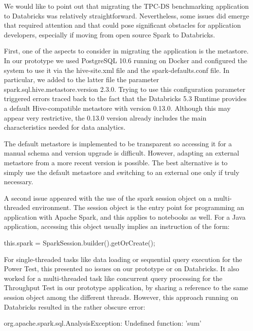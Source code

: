 We would like to point out that migrating the TPC-DS benchmarking application to Databricks was relatively straightforward. Nevertheless, some issues did emerge that required attention and that could pose significant obstacles for application developers, especially if moving from open source Spark to Databricks.

First, one of the aspects to consider in migrating the application is the metastore. In our prototype we used PostgreSQL 10.6 running on Docker and configured the system to use it via the hive-site.xml file and the spark-defaults.conf file. In particular, we added to the latter file the parameter spark.sql.hive.metastore.version 2.3.0. Trying to use this configuration parameter triggered errors traced back to the fact that the Databricks 5.3 Runtime provides a default Hive-compatible metastore with version 0.13.0. Although this may appear very restrictive, the 0.13.0 version already includes the main characteristics needed for data analytics.

The default metastore is implemented to be transparent so accessing it for a manual schema and version upgrade is difficult. However, adapting an external metastore from a more recent version is possible. The best alternative is to simply use the default metastore and switching to an external one only if truly necessary.

A second issue appeared with the use of the spark session object on a multi-threaded environment. The session object is the entry point for programming an application with Apache Spark, and this applies to notebooks as well. For a Java application, accessing this object usually implies an instruction of the form:

\vspace{0.5cm}
\noindent this.spark = SparkSession.builder().getOrCreate();
\vspace{0.5cm}

For single-threaded tasks like data loading or sequential query execution for the Power Test, this presented no issues on our prototype or on Databricks. It also worked for a multi-threaded task like concurrent query processing for the Throughput Test in our prototype application, by sharing a reference to the same session object among the different threads. However, this approach running on Databricks resulted in the rather
obscure error:

\vspace{0.5cm}
\noindent org.apache.spark.sql.AnalysisException: Undefined function: 'sum' 
\vspace{0.5cm}

